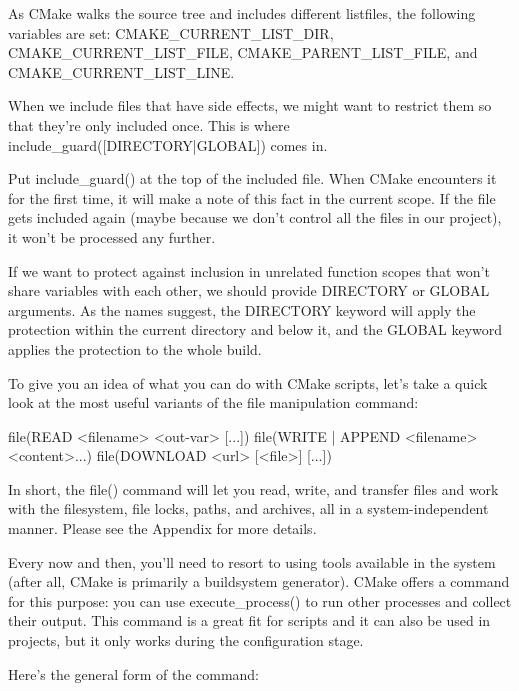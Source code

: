 As CMake walks the source tree and includes different listfiles, the following variables are set: CMAKE\_CURRENT\_LIST\_DIR, CMAKE\_CURRENT\_LIST\_FILE, CMAKE\_PARENT\_LIST\_FILE, and CMAKE\_CURRENT\_LIST\_LINE.


When we include files that have side effects, we might want to restrict them so that they’re only included once. This is where include\_guard([DIRECTORY|GLOBAL]) comes in.

Put include\_guard() at the top of the included file. When CMake encounters it for the first time, it will make a note of this fact in the current scope. If the file gets included again (maybe because we don’t control all the files in our project), it won’t be processed any further.

If we want to protect against inclusion in unrelated function scopes that won’t share variables with each other, we should provide DIRECTORY or GLOBAL arguments. As the names suggest, the DIRECTORY keyword will apply the protection within the current directory and below it, and the GLOBAL keyword applies the protection to the whole build.



To give you an idea of what you can do with CMake scripts, let’s take a quick look at the most useful variants of the file manipulation command:

\begin{shell}
file(READ <filename> <out-var> [...])
file({WRITE | APPEND} <filename> <content>...)
file(DOWNLOAD <url> [<file>] [...])
\end{shell}

In short, the file() command will let you read, write, and transfer files and work with the filesystem, file locks, paths, and archives, all in a system-independent manner. Please see the Appendix for more details.


Every now and then, you’ll need to resort to using tools available in the system (after all, CMake is primarily a buildsystem generator). CMake offers a command for this purpose: you can use execute\_process() to run other processes and collect their output. This command is a great fit for scripts and it can also be used in projects, but it only works during the configuration stage.

Here’s the general form of the command:


